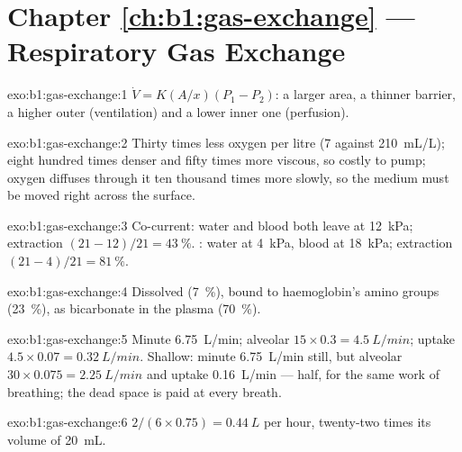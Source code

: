 \section*{Chapter \ref{ch:b1:gas-exchange} --- Respiratory Gas Exchange}

\begin{solution}{exo:b1:gas-exchange:1}
$\dot V = K(A/x)(P_1 - P_2)$: a larger area, a thinner barrier, a
higher outer  (ventilation) and a lower inner one
(perfusion).
\end{solution}

\begin{solution}{exo:b1:gas-exchange:2}
Thirty times less oxygen per litre (\qty{7}{} against \qty{210}{mL/L});
eight hundred times denser and fifty times more viscous, so costly to
pump; oxygen diffuses through it ten thousand times more slowly, so
the medium must be moved right across the surface.
\end{solution}

\begin{solution}{exo:b1:gas-exchange:3}
Co-current: water and blood both leave at \qty{12}{kPa}; extraction
$(21 - 12)/21 = \qty{43}{\%}$. : water  at
\qty{4}{kPa}, blood at \qty{18}{kPa}; extraction $(21 - 4)/21 =
\qty{81}{\%}$.
\end{solution}

\begin{solution}{exo:b1:gas-exchange:4}
Dissolved (\qty{7}{\%}), bound to haemoglobin's amino groups
(\qty{23}{\%}), as bicarbonate in the plasma (\qty{70}{\%}).
\end{solution}

\begin{solution}{exo:b1:gas-exchange:5}
Minute \qty{6.75}{L/min}; alveolar $15\times 0.3 = \qty{4.5}{L/min}$;
uptake $4.5\times 0.07 = \qty{0.32}{L/min}$. Shallow: minute
\qty{6.75}{L/min} still, but alveolar $30\times 0.075 =
\qty{2.25}{L/min}$ and uptake \qty{0.16}{L/min} --- half, for the same
work of breathing; the dead space is paid at every breath.
\end{solution}

\begin{solution}{exo:b1:gas-exchange:6}
$2/(6\times 0.75) = \qty{0.44}{L}$ per hour, twenty-two times its
volume of \qty{20}{mL}.
\end{solution}

